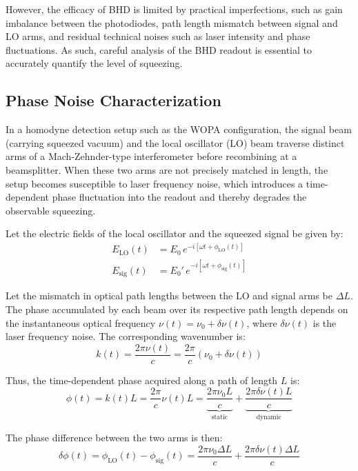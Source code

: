 \documentclass[colorlinks=true,pdfstartview=FitV,linkcolor=blue,
citecolor=red,urlcolor=magenta]{ligodoc}
\begin{document}
However, the efficacy of BHD is limited by practical imperfections, such as gain imbalance between the photodiodes, path length mismatch between signal and LO arms, and residual technical noises such as laser intensity and phase fluctuations. As such, careful analysis of the BHD readout is essential to accurately quantify the level of squeezing.


\subsection{Phase Noise Characterization}
In a homodyne detection setup such as the WOPA configuration, the signal beam (carrying squeezed vacuum) and the local oscillator (LO) beam traverse distinct arms of a Mach-Zehnder-type interferometer before recombining at a beamsplitter. When these two arms are not precisely matched in length, the setup becomes susceptible to laser frequency noise, which introduces a time-dependent phase fluctuation into the readout and thereby degrades the observable squeezing.

Let the electric fields of the local oscillator and the squeezed signal be given by:
\begin{align}
    E_{\text{LO}}(t) &= E_0 \, e^{-i[\omega t + \phi_{\text{LO}}(t)]} \\
    E_{\text{sig}}(t) &= E_0' \, e^{-i[\omega t + \phi_{\text{sig}}(t)]}
\end{align}

Let the mismatch in optical path lengths between the LO and signal arms be \( \Delta L \). The phase accumulated by each beam over its respective path length depends on the instantaneous optical frequency \( \nu(t) = \nu_0 + \delta \nu(t) \), where \( \delta \nu(t) \) is the laser frequency noise. The corresponding wavenumber is:
\begin{equation}
    k(t) = \frac{2\pi \nu(t)}{c} = \frac{2\pi}{c} (\nu_0 + \delta \nu(t))
\end{equation}

Thus, the time-dependent phase acquired along a path of length \( L \) is:
\begin{equation}
    \phi(t) = k(t) L = \frac{2\pi}{c} \nu(t) L = \underbrace{\frac{2\pi \nu_0 L}{c}}_{\text{static}} + \underbrace{\frac{2\pi \delta \nu(t) L}{c}}_{\text{dynamic}}
\end{equation}

The phase difference between the two arms is then:
\begin{equation}
    \delta \phi(t) = \phi_{\text{LO}}(t) - \phi_{\text{sig}}(t) = \frac{2\pi \nu_0 \Delta L}{c} + \frac{2\pi \delta \nu(t) \Delta L}{c}
\end{equation}
\end{document}
